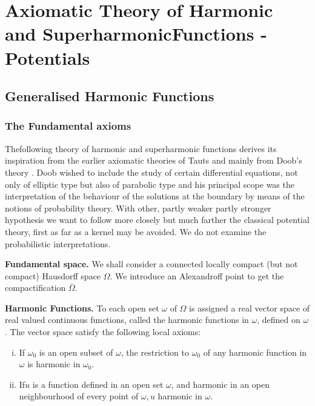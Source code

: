 \part[Axiomatic Theory of Harmonic...]{Axiomatic Theory of Harmonic and Superharmonic\break Functions -
  Potentials}\label{p4}%

\setcounter{chapter}{0}
\chapter{Generalised Harmonic Functions}\label{p4:chap1}%

\section{The Fundamental axioms}\label{p4:chap1:sec1}%

The\pageoriginale following theory of harmonic and superharmonic
functions derives 
its inspiration from the earlier axiomatic theories of Tauts \cite{5} and
mainly from Doob's theory \cite{3}. Doob wished to include the study of
certain differential equations, not only of elliptic type but also of
parabolic type and his principal scope was the interpretation of the
behaviour of the solutions at the boundary by means of the notions of
probability theory. With other, partly weaker partly stronger
hypothesis we want to follow more closely but much farther the
classical potential theory, first as far as a kernel may be
avoided. We do not examine the probabilistic interpretations. 

\medskip
\noindent
\textbf{Fundamental space.} We shall consider a connected locally
compact (but not compact) Hausdorff space $\Omega$. We introduce an
Alexandroff point to get the compactification $\bar{\Omega}$. 

\medskip
\noindent
\textbf{Harmonic Functions.} To each open set $\omega$ of $\Omega$ is
assigned a real vector space of real valued continuous functions,
called the harmonic functions in $\omega$, defined on $\omega$. The
vector space satisfy the following local axioms: 

\begin{Axiom}\label{p4:chap1:sec1:axiom1} %
  \begin{enumerate}[(i)]
  \item If $\omega_0$ is an open subset of $\omega$, the restriction
    to $\omega_0$ of any harmonic function in $\omega$ is harmonic in
    $\omega_0$. 
  \item If\pageoriginale $u$ is a function defined in an open set $\omega$, and
    harmonic in an open neighbourhood of every point of $\omega, u$
    harmonic in $\omega$. 
  \end{enumerate}
\end{Axiom}

